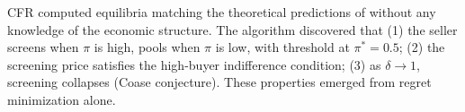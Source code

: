 CFR computed equilibria matching the theoretical predictions of \citet{gul1986foundations} without any knowledge of the economic structure. The algorithm discovered that (1) the seller screens when $\pi$ is high, pools when $\pi$ is low, with threshold at $\pi^* = 0.5$; (2) the screening price satisfies the high-buyer indifference condition; (3) as $\delta \to 1$, screening collapses (Coase conjecture). These properties emerged from regret minimization alone.

